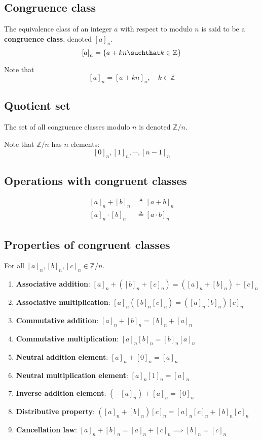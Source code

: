 \documentclass[preview]{standalone}
\begin{document}
\subsection{Congruence class}

The equivalence class of an integer \(a\) with respect to modulo \(n\)
is said to be a \textbf{congruence class}, denoted \({[a]}_n\).
\[
    {[a]}_n = \{a+kn \suchthat k \in \mathbb{Z}\}
\]

Note that
\[
    {[a]}_n = {[a + kn]}_n,\quad k \in \mathbb{Z}
\]

\subsection{Quotient set}

The set of all congruence classes modulo \(n\) is denoted \(\mathbb{Z} / n\).

Note that \(\mathbb{Z} / n\) has \(n\) elements:
\[
    {[0]}_n,{[1]}_n,\cdots,{[n-1]}_n
\]

\subsection{Operations with congruent classes}

\begin{align*}
    {[a]}_n + {[b]}_n &\triangleq {[a+b]}_n \\
    {[a]}_n \cdot {[b]}_n &\triangleq {[a \cdot b]}_n
\end{align*}

\subsection{Properties of congruent classes}

For all \({[a]}_n, {[b]}_n, {[c]}_n \in \mathbb{Z}/n\).

\begin{enumerate}
    \item \textbf{Associative addition}: \({[a]}_n + ({[b]}_n + {[c]}_n) = ({[a]}_n + {[b]}_n) + {[c]}_n\)
    \item \textbf{Associative multiplication}: \({[a]}_n ({[b]}_n {[c]}_n) = ({[a]}_n {[b]}_n) {[c]}_n\)
    \item \textbf{Commutative addition}: \({[a]}_n + {[b]}_n = {[b]}_n + {[a]}_n\)
    \item \textbf{Commutative multiplication}: \({[a]}_n {[b]}_n = {[b]}_n {[a]}_n\)
    \item \textbf{Neutral addition element}: \({[a]}_n + {[0]}_n = {[a]}_n\)
    \item \textbf{Neutral multiplication element}: \({[a]}_n {[1]}_n = {[a]}_n\)
    \item \textbf{Inverse addition element}: \((-{[a]}_n) + {[a]}_n = {[0]}_n\)
    \item \textbf{Distributive property}: \(({[a]}_n + {[b]}_n) {[c]}_n = {[a]}_n{[c]}_n + {[b]}_n{[c]}_n\)
    \item \textbf{Cancellation law}: \({[a]}_n + {[b]}_n = {[a]}_n + {[c]}_n \implies {[b]}_n = {[c]}_n\)
\end{enumerate}
\end{document}
